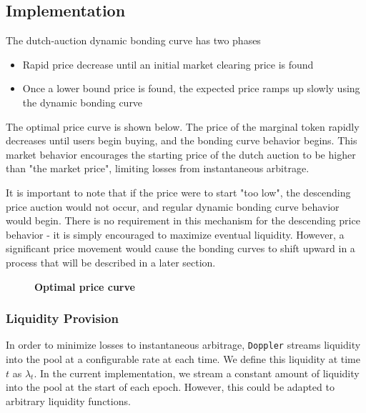 \documentclass[sigconf,nonacm,prologue,table]{acmart}
\numberwithin{equation}{section}
\theoremstyle{definition}
\theoremstyle{remark}
\begin{document}
\subsection{Implementation}

The dutch-auction dynamic bonding curve has two phases
\begin{itemize}
    \item Rapid price decrease until an initial market clearing price is found
    \item Once a lower bound price is found, the expected price ramps up slowly using the dynamic bonding curve
\end{itemize}

 The optimal price curve is shown below. The price of the marginal token rapidly decreases until users begin buying, and the bonding curve behavior begins. This market behavior encourages the starting price of the dutch auction to be higher than "the market price", limiting losses from instantaneous arbitrage.
 
 It is important to note that if the price were to start "too low", the descending price auction would not occur, and regular dynamic bonding curve behavior would begin. There is no requirement in this mechanism for the descending price behavior - it is simply encouraged to maximize eventual liquidity. However, a significant price movement would cause the bonding curves to shift upward in a process that will be described in a later section.

\begin{figure}[htb]
    \label{fig:price_curve}
    \centering
    \caption{\textbf{Optimal price curve}}
\end{figure}

\subsubsection{Liquidity Provision}

In order to minimize losses to instantaneous arbitrage, \verb|Doppler| streams liquidity into the pool at a configurable rate at each time. We define this liquidity at time $t$ as $\lambda_t$. In the current implementation, we stream a constant amount of liquidity into the pool at the start of each epoch. However, this could be adapted to arbitrary liquidity functions.
\end{document}
